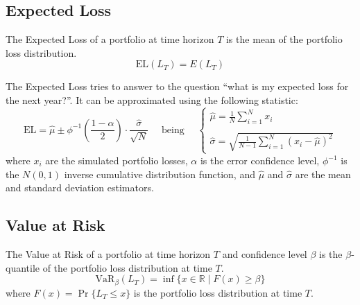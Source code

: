 \documentclass[11pt,fleqn]{book} %
\begin{document}
\subsection{Expected Loss}

\begin{definition}
	The Expected Loss of a portfolio at time horizon $T$ is the 
	mean of the portfolio loss distribution.
	\begin{displaymath}
		\text{EL}(L_T) = E(L_T)
	\end{displaymath}
\end{definition}

The Expected Loss tries to answer to the question \enquote{what is my expected 
loss for the next year?}. It can be approximated using the following 
statistic:
\begin{displaymath}
	\text{EL} = \widehat{\mu} \pm \phi^{-1}\left(\frac{1-\alpha}{2}\right) \cdot \frac{\widehat{\sigma}}{\sqrt{N}}
	\quad \text{ being } \quad
	\left\{
	\begin{array}{l}
		\displaystyle
		\widehat{\mu} = \frac{1}{N} \sum_{i=1}^{N} x_i \\
		\\
		\displaystyle
		\widehat{\sigma} =
		\sqrt{\frac{1}{N-1} \sum_{i=1}^{N} \left( x_i - \widehat{\mu} \right)^2}
	\end{array}
	\right.
\end{displaymath}
where $x_i$ are the simulated portfolio losses, $\alpha$ is the error 
confidence level, $\phi^{-1}$ is the $N(0,1)$ inverse cumulative distribution 
function, and $\widehat{\mu}$ and $\widehat{\sigma}$ are the mean and standard 
deviation estimators.

\subsection{Value at Risk}

\begin{definition}
	The Value at Risk of a portfolio at time horizon $T$ and 
	confidence level $\beta$ is the $\beta$-quantile of the portfolio loss 
	distribution at time $T$.
	\begin{displaymath}
		\text{VaR}_\beta(L_T) = \inf\{x \in \mathbb{R} \mid F(x) \ge \beta \}
	\end{displaymath}
	where $F(x)=\Pr\{L_T \le x\}$ is the portfolio loss distribution at time $T$.
\end{definition}
\end{document}

